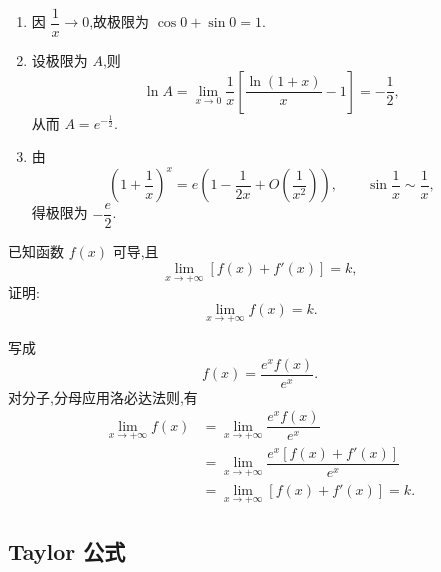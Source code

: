 \begin{solution}
    \leavevmode
    \begin{enumerate}
        \item 因 $\dfrac{1}{x}\to0$,故极限为 $\cos0+\sin0=1$.
        \item 设极限为 $A$,则
              \[
                  \ln A
                  =\lim\limits_{x\to0}\dfrac{1}{x}
                  \left[\dfrac{\ln(1+x)}{x}-1\right]
                  =-\dfrac{1}{2},
              \]
              从而 $A=e^{-\frac{1}{2}}$.
        \item 由
              \[
                  \left(1+\dfrac{1}{x}\right)^x
                  =e\left(1-\dfrac{1}{2x}+O\left(\dfrac{1}{x^2}\right)\right),
                  \qquad
                  \sin\dfrac{1}{x}\sim\dfrac{1}{x},
              \]
              得极限为 $-\dfrac{e}{2}$.
    \end{enumerate}
\end{solution}

\begin{example}[\markstar]
    已知函数 $f(x)$ 可导,且
    \[
        \displaystyle\lim\limits_{x\to+\infty}\left[f(x)+f'(x)\right]=k,
    \]
    证明:
    \[
        \displaystyle\lim\limits_{x\to+\infty}f(x)=k.
    \]
\end{example}
\exampleblank

\begin{solution}
    写成
    \[
        f(x)=\dfrac{e^xf(x)}{e^x}.
    \]
    对分子,分母应用洛必达法则,有
    \[
        \begin{aligned}
            \lim\limits_{x\to+\infty}f(x)
             & =
            \lim\limits_{x\to+\infty}
            \dfrac{e^xf(x)}{e^x}         \\
             & =
            \lim\limits_{x\to+\infty}
            \dfrac{e^x[f(x)+f'(x)]}{e^x} \\
             & =
            \lim\limits_{x\to+\infty}[f(x)+f'(x)]
            =k.
        \end{aligned}
    \]
\end{solution}

\subsection{Taylor 公式}


